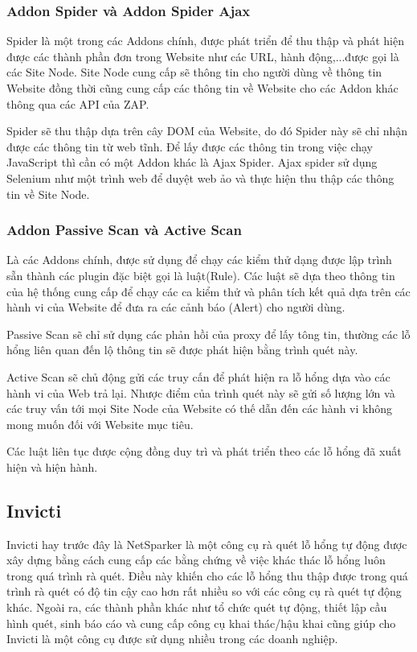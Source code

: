 \documentclass[./../main.tex]{subfiles}
\begin{document}
\subsubsection{Addon Spider và Addon Spider Ajax}
Spider là một trong các Addons chính, được phát triển để thu thập và phát
hiện được các thành phần đơn trong Website như các URL, hành động,...được gọi là các
Site Node. Site Node cung cấp sẽ thông tin cho người dùng về thông tin
Website đồng thời cũng cung cấp các thông tin về Website cho các Addon
khác thông qua các API của ZAP.

Spider sẽ thu thập dựa trên cây DOM của Website, do đó Spider này sẽ chỉ nhận
được các thông tin từ web tĩnh. Để lấy được các thông tin trong việc chạy
JavaScript thì cần có một Addon khác là Ajax Spider. Ajax spider sử dụng
Selenium như một trình web để duyệt web ảo và thực hiện thu thập các thông
tin về Site Node.
\subsubsection{Addon Passive Scan và Active Scan}
Là các Addons chính, được sử dụng để chạy các kiểm thử dạng được lập trình
sẵn thành các plugin đặc biệt gọi là luật(Rule). Các luật sẽ dựa theo thông
tin của hệ thống cung cấp để chạy các ca kiểm thử và phân tích kết quả dựa
trên các hành vi của Website để đưa ra các cảnh báo (Alert) cho người dùng.

Passive Scan sẽ chỉ sử dụng các phản hồi của proxy để lấy tông tin, thường
các lỗ hổng liên quan đến lộ thông tin sẽ được phát hiện bằng trình quét này.

Active Scan sẽ chủ động gửi các truy cấn để phát hiện ra lỗ hổng dựa vào
các hành vi của Web trả lại. Nhược điểm của trình quét này sẽ gửi số lượng
lớn và các truy vấn tới mọi Site Node của Website có thế dẫn đến các hành vi
không mong muốn đối với Website mục tiêu.

Các luật liên tục được cộng đồng duy trì và phát triển theo các lỗ hổng
đã xuất hiện và hiện hành.

\subsection{Invicti}

Invicti hay trước đây là NetSparker là một công cụ rà quét lỗ hổng tự động
được xây dựng bằng cách cung cấp các bằng chứng về việc khác thác lỗ hổng luôn
trong quá trình rà quét. Điều này khiến cho các lỗ hổng thu thập được trong
quá trình rà quét có độ tin cậy cao hơn rất nhiều so với các công cụ
rà quét tự động khác. Ngoài ra, các thành phần khác
như tổ chức quét tự động, thiết lập cầu hình quét, sinh báo cáo và cung cấp
công cụ khai thác/hậu khai cũng giúp cho Invicti là một công cụ được sử dụng
nhiều trong các doanh nghiệp.
\end{document}
